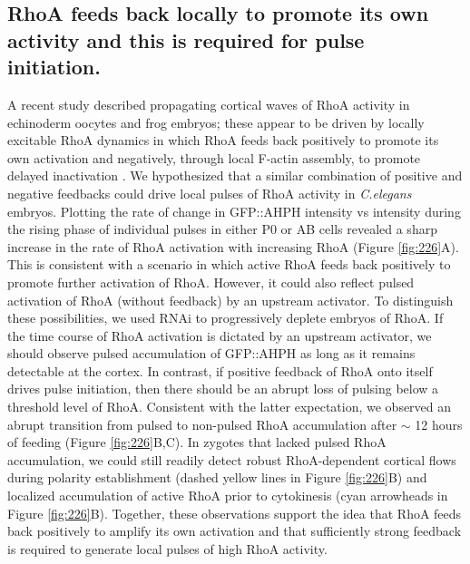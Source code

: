 \subsection{RhoA feeds back locally to promote its own activity and this is required for pulse initiation.}
A recent study described propagating cortical waves of RhoA activity in echinoderm oocytes and frog embryos; these appear to be driven by locally excitable RhoA dynamics in which RhoA feeds back positively to promote its own activation and negatively, through local F-actin assembly, to promote delayed inactivation  \cite{Bement:2015jp}.  We hypothesized that a similar combination of positive and negative feedbacks could drive local pulses of RhoA activity in \textit{C.elegans} embryos.  Plotting the rate of change in GFP::AHPH intensity vs intensity during the rising phase of individual pulses in either P0 or AB cells revealed a sharp increase in the rate of RhoA activation with increasing RhoA (Figure \ref{fig:226}A). This is consistent with a scenario in which active RhoA feeds back positively to promote further activation of RhoA.  However, it could also reflect pulsed activation of RhoA (without feedback) by an upstream activator.  To distinguish these possibilities, we used RNAi to progressively deplete embryos of RhoA. If the time course of RhoA activation is dictated by an upstream activator, we should observe pulsed accumulation of GFP::AHPH as long as it remains detectable at the cortex. In contrast, if positive feedback of RhoA onto itself drives pulse initiation, then there should be an abrupt loss of pulsing below a threshold level of RhoA.  Consistent with the latter expectation, we observed an abrupt transition from pulsed to non-pulsed RhoA accumulation after $\sim$ 12 hours of feeding (Figure \ref{fig:226}B,C).  In zygotes that lacked pulsed RhoA accumulation, we could still readily detect robust RhoA-dependent cortical flows  \cite{Motegi:2006hi, Schonegg:2006ed} during polarity establishment (dashed yellow lines in Figure \ref{fig:226}B) and localized accumulation of active RhoA prior to cytokinesis (cyan arrowheads in Figure \ref{fig:226}B).  Together, these observations support the idea that RhoA feeds back positively to amplify its own activation and that sufficiently strong feedback is required to generate local pulses of high RhoA activity. 


